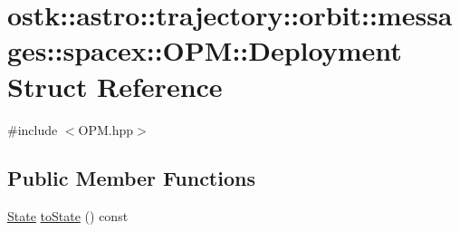 \hypertarget{structostk_1_1astro_1_1trajectory_1_1orbit_1_1messages_1_1spacex_1_1_o_p_m_1_1_deployment}{}\section{ostk\+:\+:astro\+:\+:trajectory\+:\+:orbit\+:\+:messages\+:\+:spacex\+:\+:O\+PM\+:\+:Deployment Struct Reference}
\label{structostk_1_1astro_1_1trajectory_1_1orbit_1_1messages_1_1spacex_1_1_o_p_m_1_1_deployment}


{\ttfamily \#include $<$O\+P\+M.\+hpp$>$}

\subsection*{Public Member Functions}
\begin{DoxyCompactItemize}
\item 
\hyperlink{classostk_1_1astro_1_1trajectory_1_1_state}{State} \hyperlink{structostk_1_1astro_1_1trajectory_1_1orbit_1_1messages_1_1spacex_1_1_o_p_m_1_1_deployment_af2bf23e67f06e5a049f0399c011aaf97}{to\+State} () const
\end{DoxyCompactItemize}
